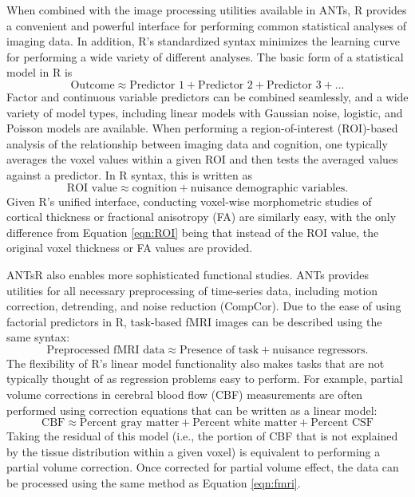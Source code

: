 When combined with the image processing utilities available in ANTs, R provides a convenient and powerful interface for performing common statistical analyses of imaging data.  In addition, R's standardized syntax minimizes the learning curve for performing a wide variety of different analyses.  The basic form of a statistical model in R is 
\begin{equation}
\text{Outcome} \approx \text{Predictor 1} + \text{Predictor 2} + \text{Predictor 3} + ...
\label{eqn:r_syntax}
\end{equation}
Factor and continuous variable predictors can be combined seamlessly, and a wide variety of model types, including linear models with Gaussian noise, logistic, and Poisson models are available.  When performing a region-of-interest (ROI)-based analysis of the relationship between imaging data and cognition, one typically averages the voxel values within a given ROI and then tests the averaged values against a predictor.  In R syntax, this is written as 
\begin{equation}
\text{ROI value} \approx \text{cognition} + \text{nuisance demographic variables}. 
\label{eqn:ROI}
\end{equation}
Given R's unified interface, conducting voxel-wise morphometric studies of cortical thickness or fractional anisotropy (FA) are similarly easy, with the only difference from Equation \ref{eqn:ROI} being that instead of the ROI value, the original voxel thickness or FA values are provided.  

ANTsR also enables more sophisticated functional studies.  ANTs provides utilities for all necessary preprocessing of time-series data, including motion correction, detrending, and noise reduction (CompCor).  Due to the ease of using factorial predictors in R, task-based fMRI images can be described using the same syntax: 
\begin{equation}
\text{Preprocessed fMRI data} \approx \text{Presence of task} + \text{nuisance regressors}.
\label{eqn:fmri}
\end{equation}
The flexibility of R's linear model functionality also makes tasks that are not typically thought of as regression problems easy to perform.  For example, partial volume corrections in cerebral blood flow (CBF) measurements are often performed using correction equations that can be written as a linear model: 
\begin{equation}
\text{CBF} \approx \text{Percent gray matter} + \text{Percent white matter} + \text{Percent CSF}
\end{equation}
Taking the residual of this model (i.e., the portion of CBF that is not explained by the tissue distribution within a given voxel) is equivalent to performing a partial volume correction.  Once corrected for partial volume effect, the data can be processed using the same method as Equation \ref{eqn:fmri}. 

